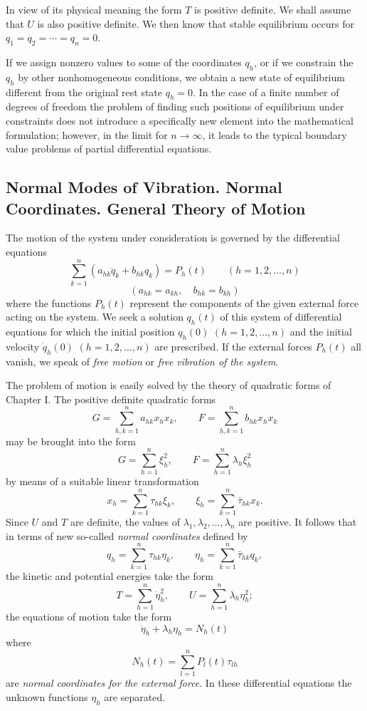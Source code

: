 In view of its physical meaning the form $T$ is positive definite. We shall assume that $U$ is also positive definite. We then know that stable equilibrium occurs for $q_1=q_2=\cdots=q_n=0$.

If we assign nonzero values to some of the coordinates $q_h$, or if we constrain the $q_h$ by other nonhomogeneous conditions, we obtain a new state of equilibrium different from the original rest state $q_h=0$. In the case of a finite number of degrees of freedom the problem of finding such positions of equilibrium under constraints does not introduce a specifically new element into the mathematical formulation; however, in the limit for $n\to\infty$, it leads to the typical boundary value problems of partial differential equations.

\subsection{Normal Modes of Vibration. Normal Coordinates. General Theory of Motion}
The motion of the system under consideration is governed by the differential equations
\begin{equation}\tag{6}
\sum_{k=1}^n(a_{hk}\ddot q_k+b_{hk}q_k)=P_h(t)\qquad(h=1,2,\ldots,n)
\end{equation}
\[
(a_{hk}=a_{kh},\quad b_{hk}=b_{kh})
\]
where the functions $P_h(t)$ represent the components of the given external force acting on the system. We seek a solution $q_h(t)$ of this system of differential equations for which the initial position $q_h(0)$ $(h=1,2,\ldots,n)$ and the initial velocity $\dot q_h(0)$ $(h=1,2,\ldots,n)$ are prescribed. If the external forces $P_h(t)$ all vanish, we speak of \emph{free motion} or \emph{free vibration of the system}.

The problem of motion is easily solved by the theory of quadratic forms of Chapter I. The positive definite quadratic forms
\[
G=\sum_{h,k=1}^n a_{hk}x_hx_k,
\qquad
F=\sum_{h,k=1}^n b_{hk}x_hx_k
\]
may be brought into the form
\[
G=\sum_{h=1}^n\xi_h^2,
\qquad
F=\sum_{h=1}^n\lambda_h\xi_h^2
\]
by means of a suitable linear transformation
\begin{equation}\tag{7}
x_h=\sum_{k=1}^n\tau_{hk}\xi_k,
\qquad
\xi_h=\sum_{k=1}^n\bar\tau_{hk}x_k.
\end{equation}
Since $U$ and $T$ are definite, the values of $\lambda_1,\lambda_2,\ldots,\lambda_n$ are positive. It follows that in terms of new so-called \emph{normal coordinates} defined by
\begin{equation}\tag{7a}
q_h=\sum_{k=1}^n\tau_{hk}\eta_k,
\qquad
\eta_h=\sum_{k=1}^n\bar\tau_{hk}q_k,
\end{equation}
the kinetic and potential energies take the form
\[
T=\sum_{h=1}^n\dot\eta_h^2,
\qquad
U=\sum_{h=1}^n\lambda_h\eta_h^2;
\]
the equations of motion take the form
\[
\ddot\eta_h+\lambda_h\eta_h=N_h(t)
\]
where
\[
N_h(t)=\sum_{l=1}^nP_l(t)\tau_{lh}
\]
are \emph{normal coordinates for the external force}. In these differential equations the unknown functions $\eta_h$ are separated.

